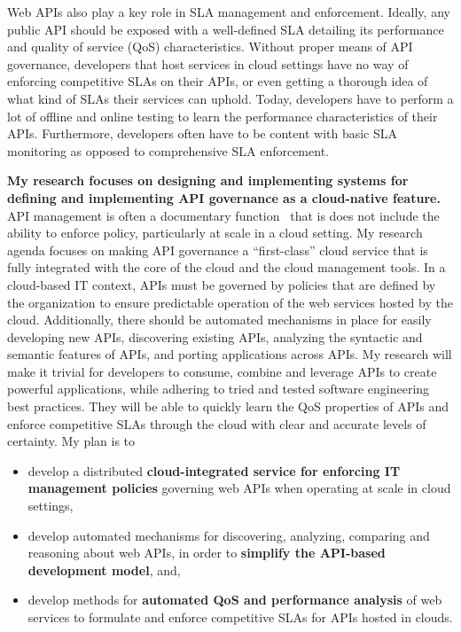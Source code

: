 Web APIs also play a key role in SLA
management and enforcement. Ideally, any public API should be exposed with a well-defined
SLA detailing its performance and quality of service (QoS) characteristics. Without proper means
of API governance, developers that host services in cloud settings have no way of enforcing
competitive SLAs on their APIs, or even getting a thorough idea of what kind of SLAs
their services can uphold. Today, developers have to perform a lot of offline
and online testing to learn the performance characteristics of their APIs.
Furthermore, developers often have to be content with basic SLA monitoring 
as opposed to comprehensive SLA enforcement. 

{\bf My research focuses on designing and implementing systems for defining and
implementing 
API governance as a cloud-native feature.}  API management is often a
documentary function~\cite{XXXWSO2XXX} that is does not include the ability to
enforce policy, particularly at scale in a cloud setting. 
My research agenda focuses on making API governance a ``first-class'' cloud
service that is fully integrated
with the core of the cloud and the cloud management tools. 
In a cloud-based IT context, APIs must be governed by
policies that are defined by the organization to ensure predictable
operation of the web services hosted by the cloud. Additionally,
there should be automated mechanisms in place for easily developing new
APIs, discovering existing APIs, analyzing the syntactic and semantic features
of APIs, and porting applications across APIs. My research will make 
it trivial for developers to consume, combine and leverage APIs to create powerful
applications, while adhering to tried and tested software engineering 
best practices. They will be able to quickly learn
the QoS properties of APIs and enforce competitive SLAs through the cloud
with clear and accurate levels of certainty. My plan is to
\begin{itemize}
\item develop a distributed {\bf cloud-integrated service for enforcing IT 
management policies} governing
web APIs when operating at scale in cloud settings,
\item develop automated mechanisms for discovering, analyzing, comparing and reasoning
about web APIs, in order to {\bf simplify the API-based development model}, and,
\item develop methods for {\bf automated QoS and performance analysis} of web services
to formulate and enforce competitive SLAs for APIs hosted in clouds.
\end{itemize}

